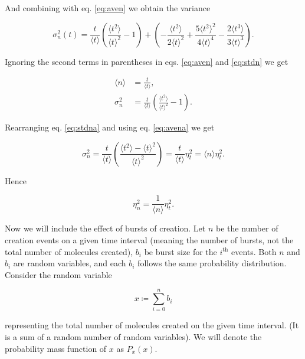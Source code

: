 And combining with eq. \eqref{eq:aven} we obtain the variance

\begin{equation}
  \label{eq:stdn}
  \sigma_n^2(t) = \frac{t}{\langle t\rangle}\left(\frac{\langle t^2\rangle}{\langle t\rangle^2}-1\right)+\left(-\frac{\langle t^2\rangle}{2\langle t\rangle^2} + \frac{5\langle t^2\rangle^2}{4\langle t\rangle^4}-\frac{2\langle t^3\rangle}{3\langle t\rangle^3}\right).
\end{equation}


Ignoring the second terms in parentheses in eqs. \ref{eq:aven} and \ref{eq:stdn} we get

\begin{align}
  \langle n\rangle &= \frac{t}{\langle t\rangle}, \label{eq:avena} \\
  \sigma_n^2 &= \frac{t}{\langle t\rangle}\left(\frac{\langle t^2\rangle}{\langle t\rangle^2}-1\right). \label{eq:stdna}
\end{align}

Rearranging eq. \eqref{eq:stdna} and using eq. \eqref{eq:avena} we get

\begin{equation*}
  \sigma_n^2 = \frac{t}{\langle t\rangle}\left(\frac{\langle t^2\rangle - \langle t\rangle^2}{\langle t\rangle^2}\right) = \frac{t}{\langle t\rangle}\eta_t^2 = \langle n\rangle\eta_t^2.
\end{equation*}

Hence

\begin{equation}
  \label{eq:noisen1}
  \eta_n^2=\frac{1}{\langle n\rangle}\eta_t^2.
\end{equation}

Now we will include the effect of bursts of creation. Let $n$ be the number of creation events on a given time interval (meaning the number of bursts, not the total number of molecules created), $b_i$ be burst size for the $i^{\text{th}}$ events. Both $n$ and $b_i$ are random variables, and each $b_i$ follows the same probability distribution. Consider the random variable

\begin{equation}
  \label{eq:xtotal}
  x\coloneqq\sum_{i=0}^nb_i
\end{equation}

representing the total number of molecules created on the given time interval. (It is a sum of a random number of random variables). We will denote the probability mass function of $x$ as $P_x(x)$.

